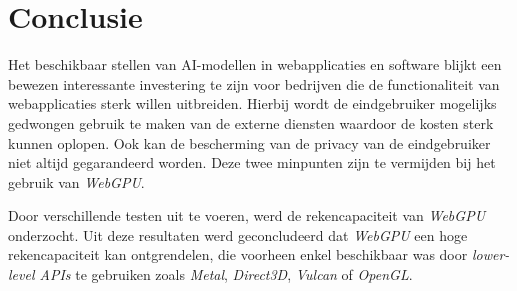 
\chapter{Conclusie}%
\label{ch:conclusie}





Het beschikbaar stellen van AI-modellen in webapplicaties en software blijkt een bewezen interessante investering te zijn voor bedrijven die de functionaliteit van webapplicaties sterk willen uitbreiden. Hierbij wordt de eindgebruiker mogelijks gedwongen gebruik te maken van de externe diensten waardoor de kosten sterk kunnen oplopen. Ook kan de bescherming van de privacy van de eindgebruiker niet altijd gegarandeerd worden. Deze twee minpunten zijn te vermijden bij het gebruik van \textit{WebGPU}.

\bigbreak{}

Door verschillende testen uit te voeren, werd de rekencapaciteit van \textit{WebGPU} onderzocht. Uit deze resultaten werd geconcludeerd dat \textit{WebGPU}  een hoge rekencapaciteit kan ontgrendelen, die voorheen enkel beschikbaar was door \textit{lower-level APIs} te gebruiken zoals \textit{Metal}, \textit{Direct3D}, \textit{Vulcan} of \textit{OpenGL}.


